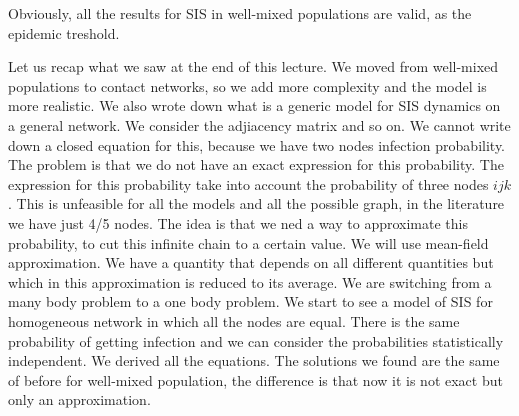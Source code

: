 \documentclass[../main/main.tex]{subfiles}
\begin{document}
Obviously, all the results for SIS in well-mixed populations are valid, as the epidemic treshold.

\begin{remark}
Let us recap what we saw at the end of this lecture. We moved from well-mixed populations to contact networks, so we add more complexity and the model is more realistic. We also wrote down what is a generic model for SIS dynamics on a general network. We consider the adjiacency matrix and so on. We cannot write down a closed equation for this, because we have two nodes infection probability. The problem is that we do not have an exact expression for this probability. The expression for this probability take into account the probability of three nodes \( i j k \). This is unfeasible for all the models and all the possible graph, in the literature we have just 4/5 nodes. The idea is that we ned a way to approximate this probability, to cut this infinite chain to a certain value. We will use mean-field approximation. We have a quantity that depends on all different quantities but which in this approximation is reduced to its average. We are switching from a many body problem to a one body problem.
We start to see a model of SIS for homogeneous network in which all the nodes are equal. There is the same probability of getting infection and we can consider the probabilities statistically independent.
We derived all the equations. The solutions we found are the same of before for well-mixed population, the difference is that now it is not exact but only an approximation.
\end{remark}
\end{document}
